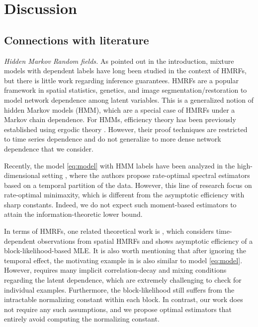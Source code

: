 \documentclass[preprint,reqno]{imsart}
\begin{document}
\section{Discussion}
\subsection{Connections with literature}
\noindent \emph{Hidden Markov Random fields.} 
As pointed out in the introduction, mixture models with dependent labels have long been studied in the context of HMRFs, but there is little work regarding inference guarantees.
HMRFs are a popular framework in spatial statistics, genetics, and image segmentation/restoration \citep{besag1986statistical, franccois2006bayesian, pyun2002robust, chatzis2010infinite} to model network dependence among latent variables. This is a generalized notion of hidden Markov models (HMM), which are a special case of HMRFs under a Markov chain dependence. For HMMs, efficiency theory has been previously established using ergodic theory \citep{bickel1996inference, bickel1998asymptotic}. However, their proof techniques are restricted to time series dependence and do not generalize to more dense network dependence that we consider. 

Recently, the model \eqref{eq:model} with HMM labels have been analyzed in the high-dimensional setting \citep{zhang2022mean, karagulyan2024adaptive}, where the authors propose rate-optimal spectral estimators based on a temporal partition of the data. However, this line of research focus on rate-optimal minimaxity, which is different from the asymptotic efficiency with sharp constants. Indeed, we do not expect such moment-based estimators to attain the information-theoretic lower bound.
%

In terms of HMRFs, one related theoretical work is \cite{lai2015asymptotically}, which considers time-dependent observations from spatial HMRFs and shows asymptotic efficiency of a block-likelihood-based MLE. It is also worth mentioning that after ignoring the temporal effect, the motivating example in \cite{lai2015asymptotically} is also similar to model \eqref{eq:model}. However, \cite{lai2015asymptotically} requires many implicit correlation-decay and mixing conditions regarding the latent dependence, which are extremely challenging to check for individual examples. Furthermore, the block-likelihood still suffers from the intractable normalizing constant within each block. In contrast, our work does not require any such assumptions, and we propose optimal estimators that entirely avoid computing the normalizing constant.
\end{document}
